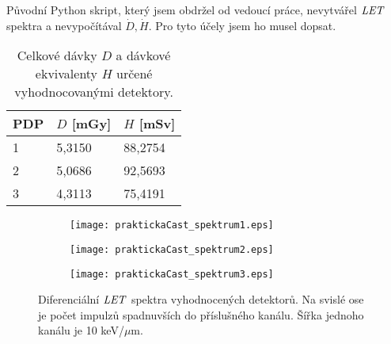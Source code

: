 Původní Python skript, který jsem obdržel od vedoucí práce, nevytvářel $\mathit{LET}$ spektra a nevypočítával $\dot{D},\dot{H}$. Pro tyto účely jsem ho musel dopsat. 
\begin{table}[h]
  \centering
  \caption{Celkové dávky $D$ a dávkové ekvivalenty $H$ určené vyhodnocovanými detektory.}
  \label{tab:praktickaCast_davkyVysledky}
  \begin{tabular}{lll}
	\toprule
	PDP&$D$ [mGy]&$H$ [mSv]\\
	\midrule
	1&5,3150&88,2754\\
	2&5,0686&92,5693\\
	3&4,3113&75,4191\\
	\bottomrule
  \end{tabular}
\end{table}
\begin{figure}[h]
  \centering
  \begin{subfigure}{0.49\textwidth}
	\texttt{[image: praktickaCast\_spektrum1.eps]}
	\caption{}
  \end{subfigure}
  \begin{subfigure}{0.49\textwidth}
	\texttt{[image: praktickaCast\_spektrum2.eps]}
	\caption{}
  \end{subfigure}
  \begin{subfigure}{0.49\textwidth}
	\texttt{[image: praktickaCast\_spektrum3.eps]}
	\caption{}
  \end{subfigure}
  \caption{Diferenciální $\mathit{LET}$ spektra vyhodnocených detektorů. Na svislé ose je počet impulzů spadnuvších do příslušného kanálu. Šířka jednoho kanálu je 10 keV/$\mu$m.}
  \label{fig:praktickaCast_LETspektra}
\end{figure}

